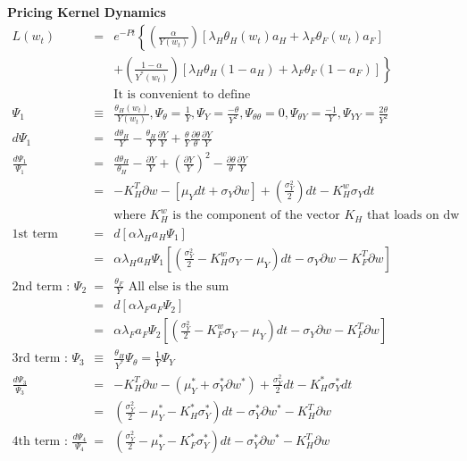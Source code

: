 \documentclass[]{article}
\begin{document}
\textbf{Pricing Kernel Dynamics}
\begin{eqnarray*}
L(w_t) &=& e^{-Pt} \left\{\left(\frac{\alpha}{Y(w_t)}\right)\left[\lambda_H \theta_H(w_t)a_H+ \lambda_F \theta_F(w_t)a_F\right] \right. \\
&& \left. + \left(\frac{1-\alpha}{Y^*(w_t)}\right)\left[\lambda_H \theta_H(1-a_H) + \lambda_F \theta_F (1-a_F)\right]\right\}\\
&& \mbox{It is convenient to define}\\
\Psi_1 &\equiv & \frac{\theta_H(w_t)}{Y(w_t)}, \Psi_\theta = \frac{1}{Y}, \Psi_Y = \frac{-\theta}{Y^2}, \Psi_{\theta \theta} = 0, \Psi_{\theta Y} = \frac{-1}{Y}, \Psi_{YY} = \frac{2\theta}{Y^2}\\
d\Psi_1 &=& \frac{d\theta_H}{Y} - \frac{\theta_H}{Y} \frac{\partial Y}{Y} + \frac{\theta}{Y} \frac{\partial \theta}{\theta} \frac{\partial Y}{Y}\\
\frac{d\Psi_1}{\Psi_1} &=& \frac{d\theta_H}{\theta_H} - \frac{\partial Y}{Y} + \left(\frac{\partial Y}{Y}\right)^2 - \frac{\partial \theta}{\theta} \frac{\partial Y}{Y}\\
&=& -K_H^T \partial w - [\mu_Y dt + \sigma_Y \partial w] + \left(\frac{\sigma_Y^2}{2}\right)dt - K_H^w \sigma _Y dt\\
&& \mbox{where $K_H^w$ is the component of the vector $K_H$ that loads on dw}\\
\mbox{1st term } &=& d[\alpha \lambda_H a_H \Psi_1]\\
&=& \alpha \lambda_H a_H \Psi_1 \left[\left(\frac{\sigma_Y^2}{2} - K_H^w \sigma_Y - \mu_Y \right)dt - \sigma_Y \partial w -K_F^T \partial w \right]\\
\mbox{2nd term : } \Psi_2 &=& \frac{\theta_F}{Y} \mbox{ All else is the sum}\\
&=& d[\alpha \lambda_F a_F \Psi_2]\\
&=& \alpha \lambda_F a_F \Psi_2 \left[\left(\frac{\sigma_Y^2}{2} - K_F^w \sigma_Y - \mu_Y \right)dt - \sigma_Y \partial w - K_F^T \partial w\right]\\
\mbox{3rd term : } \Psi_3 &\equiv & \frac{\theta_H}{Y^*} \Psi_\theta = \frac{1}{Y} \Psi_Y \\
\frac{d\Psi_3}{\Psi_3} &=& -K_H^T \partial w - (\mu_Y^* + \sigma_Y^* \partial w^*) + \frac{\sigma_Y^2}{2}dt - K_H^* \sigma_Y^* dt\\
&=& \left(\frac{\sigma_Y^2}{2} - \mu_Y^* - K_H^* \sigma_Y^* \right) dt - \sigma_Y^* \partial w^* - K_H^T \partial w\\
\mbox{4th term : }\frac{d\Psi_4}{\Psi_4} &=& \left(\frac{\sigma_Y^2}{2} - \mu_Y^* - K_F^* \sigma_Y^* \right) dt - \sigma_Y^* \partial w^* - K_H^T \partial w\\

\end{eqnarray*}
\end{document}
